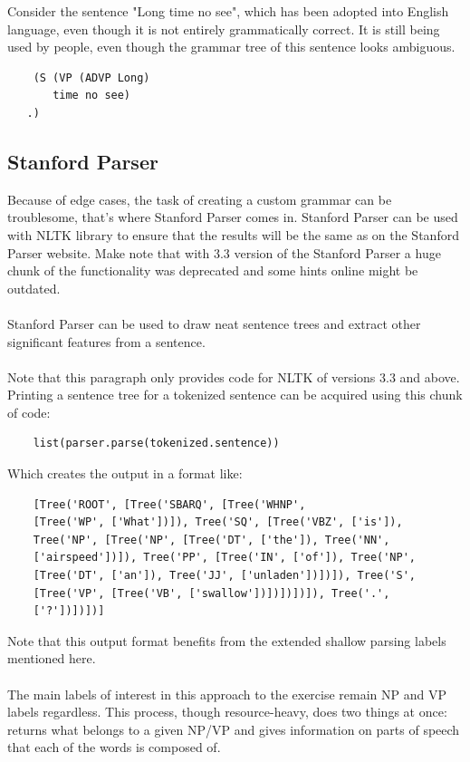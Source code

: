\documentclass{article}
\begin{document}
Consider the sentence "Long time no see", which has been adopted into English language, even though it is not entirely grammatically correct. It is still being used by people, even though the grammar tree of this sentence looks ambiguous.
\begin{verbatim}
    (S (VP (ADVP Long)
       time no see)
   .)
\end{verbatim}
\newpage

\subsection{Stanford Parser}
Because of edge cases, the task of creating a custom grammar can be troublesome, that's where Stanford Parser comes in. Stanford Parser can be used with NLTK library to ensure that the results will be the same as on the Stanford Parser website.\cite{Stanford Parser demo} Make note that with 3.3 version of the Stanford Parser a huge chunk of the functionality was deprecated and some hints online might be outdated. \\ \\
Stanford Parser can be used to draw neat sentence trees and extract other significant features from a sentence. \\ \\
Note that this paragraph only provides code for NLTK of versions 3.3 and above\cite{New NLTK Tokenizer}. Printing a sentence tree for a tokenized sentence can be acquired using this chunk of code:
\begin{verbatim}
    list(parser.parse(tokenized.sentence))
\end{verbatim}
Which creates the output in a format like:
\begin{verbatim}
    [Tree('ROOT', [Tree('SBARQ', [Tree('WHNP', 
    [Tree('WP', ['What'])]), Tree('SQ', [Tree('VBZ', ['is']), 
    Tree('NP', [Tree('NP', [Tree('DT', ['the']), Tree('NN', 
    ['airspeed'])]), Tree('PP', [Tree('IN', ['of']), Tree('NP',
    [Tree('DT', ['an']), Tree('JJ', ['unladen'])])]), Tree('S',
    [Tree('VP', [Tree('VB', ['swallow'])])])])]), Tree('.', 
    ['?'])])])]
\end{verbatim}
Note that this output format benefits from the extended shallow parsing labels mentioned here\cite{More labels for Stanford Parser}. \\ \\
The main labels of interest in this approach to the exercise remain NP and VP labels regardless. This process, though resource-heavy, does two things at once: returns what belongs to a given NP/VP and gives information on parts of speech that each of the words is composed of.
\end{document}
